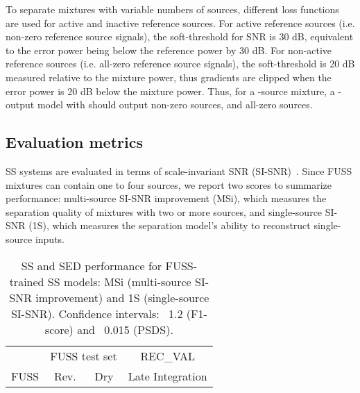 \documentclass{article}
\begin{document}
\begin{sloppy}
To separate mixtures with variable numbers of sources, different loss functions are used for active and inactive reference sources. For active reference sources (i.e. non-zero reference source signals), the soft-threshold for SNR is 30 dB, equivalent to the error power being below the reference power by 30 dB. For non-active reference sources (i.e. all-zero reference source signals), the soft-threshold is 20 dB measured relative to the mixture power, thus gradients are clipped when the error power is 20 dB below the mixture power. Thus, for a -source mixture, a -output model with  should output  non-zero sources, and  all-zero sources.

\subsection{Evaluation metrics}

SS systems are evaluated in terms of scale-invariant SNR (SI-SNR)~\cite{LeRoux2018a}. Since FUSS mixtures can contain one to four sources, we report two scores to summarize performance: multi-source SI-SNR improvement (MSi), which measures the separation quality of mixtures with two or more sources, and single-source SI-SNR (1S), which measures the separation model's ability to reconstruct single-source inputs.

\begin{table}[t]
\centering
\caption{SS and SED performance for FUSS-trained SS models: MSi (multi-source SI-SNR improvement) and 1S (single-source SI-SNR). Confidence intervals: ~1.2 (F1-score) and ~0.015 (PSDS).}
\begin{tabular}{|l|rrrr||c|c|}
\hline&\multicolumn{4}{c||}{FUSS test set}&\multicolumn{2}{c|}{REC\_VAL}\\
FUSS  & \multicolumn{2}{c}{Rev.} & \multicolumn{2}{c||}{Dry}&\multicolumn{2}{c|}{Late Integration}\\


\end{tabular}
\end{table}
\end{sloppy}
\end{document}
